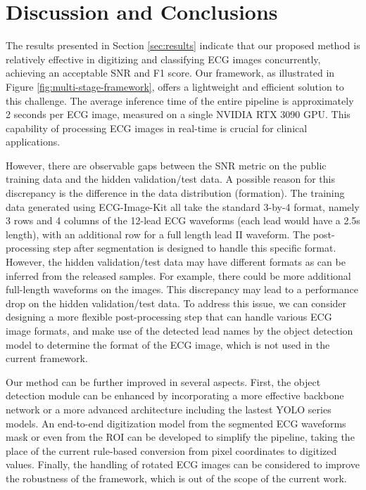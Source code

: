 \section{Discussion and Conclusions}
\label{sec:discu}


The results presented in Section \ref{sec:results} indicate that our proposed method is relatively effective in digitizing and classifying ECG images concurrently, achieving an acceptable SNR and F1 score. Our framework, as illustrated in Figure \ref{fig:multi-stage-framework}, offers a lightweight and efficient solution to this challenge. The average inference time of the entire pipeline is approximately 2 seconds per ECG image, measured on a single NVIDIA RTX 3090 GPU. This capability of processing ECG images in real-time is crucial for clinical applications.

However, there are observable gaps between the SNR metric on the public training data and the hidden validation/test data. A possible reason for this discrepancy is the difference in the data distribution (formation). The training data generated using ECG-Image-Kit \cite{Shivashankara_2024_ECG} all take the standard 3-by-4 format, namely 3 rows and 4 columns of the 12-lead ECG waveforms (each lead would have a 2.5s length), with an additional row for a full length lead II waveform. The post-processing step after segmentation is designed to handle this specific format. However, the hidden validation/test data may have different formats as can be inferred from the released samples. For example, there could be more additional full-length waveforms on the images. This discrepancy may lead to a performance drop on the hidden validation/test data. To address this issue, we can consider designing a more flexible post-processing step that can handle various ECG image formats, and make use of the detected lead names by the object detection model to determine the format of the ECG image, which is not used in the current framework.

Our method can be further improved in several aspects. First, the object detection module can be enhanced by incorporating a more effective backbone network or a more advanced architecture including the lastest YOLO series models. An end-to-end digitization model from the segmented ECG waveforms mask or even from the ROI can be developed to simplify the pipeline, taking the place of the current rule-based conversion from pixel coordinates to digitized values. Finally, the handling of rotated ECG images can be considered to improve the robustness of the framework, which is out of the scope of the current work.
